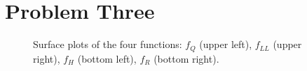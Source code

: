 

\section{Problem Three}

\begin{figure}[h!tbp]
       \caption{Surface plots of the four functions: $f_Q$ (upper left),
       $f_{LL}$ (upper right), $f_H$ (bottom left), $f_R$ (bottom right).}
\end{figure}



